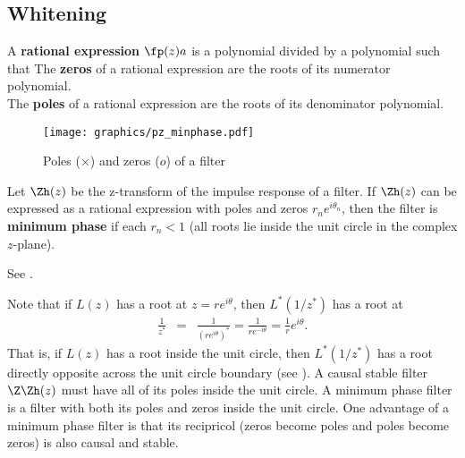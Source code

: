 \subsection{Whitening}
\label{sec:d-whiten}
\begin{definition}
A \textbf{rational expression} $\fp(z)a$ is a polynomial divided by a polynomial
such that
The \textbf{zeros} of a rational expression are the roots of its numerator polynomial. \\
The \textbf{poles} of a rational expression are the roots of its denominator polynomial.
\end{definition}



\begin{figure}[h]
  \centering
  \texttt{[image: graphics/pz\_minphase.pdf]}
  \caption{
     Poles ($\times$) and zeros ($o$) of a  filter
     \label{fig:w_pz_minphase}
     }
\end{figure}
\begin{definition}
Let $\Zh(z)$ be the z-transform of the impulse response of a filter.
If $\Zh(z)$ can be expressed as a rational expression with poles and zeros
$r_ne^{i\theta_n}$,
then the filter is \textbf{minimum phase} if each $r_n<1$
(all roots lie inside the unit circle in the complex $z$-plane).
\end{definition}
See .

Note that if $L(z)$ has a root at $z=re^{i\theta}$, then
$L^\ast(1/z^\ast)$ has a root at
\begin{eqnarray*}
   \frac{1}{z^\ast}
     &=& \frac{1}{\left(re^{i\theta}\right)^\ast}
      = \frac{1}{re^{-i\theta}}
      = \frac{1}{r} e^{i\theta}.
\end{eqnarray*}
That is, if $L(z)$ has a root inside the unit circle,
then $L^\ast(1/z^\ast)$ has a root directly opposite across the unit circle
boundary (see ).
A causal stable filter $\Z\Zh(z)$ must have all of its poles inside
the unit circle.
A minimum phase filter is a filter with both its poles and zeros inside the
unit circle.
One advantage of a minimum phase filter is that its recipricol
(zeros become poles and poles become zeros)
is also causal and stable.

